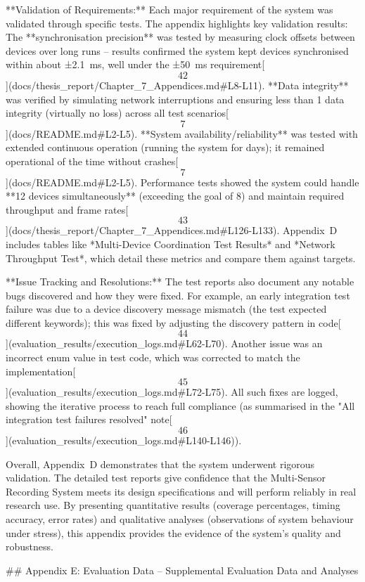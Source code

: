 \documentclass[12pt,a4paper]{article}
\begin{document}
{**Validation of Requirements:** Each major requirement of the system was
validated through specific tests. The appendix highlights key validation
results: The **synchronisation precision** was tested by measuring clock
offsets between devices over long runs -- results confirmed the system
kept devices synchronised within about ±2.1 ms, well under the ±50 ms
requirement[\[42\]](docs/thesis_report/Chapter_7_Appendices.md#L8-L11).
**Data integrity** was verified by simulating network interruptions and
ensuring less than 1%
data integrity (virtually no loss) across all test
scenarios[\[7\]](docs/README.md#L2-L5).
**System availability/reliability** was tested with extended continuous
operation (running the system for days); it remained operational %
of the time without
crashes[\[7\]](docs/README.md#L2-L5).
Performance tests showed the system could handle **12 devices
simultaneously** (exceeding the goal of 8) and maintain required
throughput and frame
rates[\[43\]](docs/thesis_report/Chapter_7_Appendices.md#L126-L133).
Appendix D includes tables like *Multi-Device Coordination Test Results*
and *Network Throughput Test*, which detail these metrics and compare
them against targets.

**Issue Tracking and Resolutions:** The test reports also document any
notable bugs discovered and how they were fixed. For example, an early
integration test failure was due to a device discovery message mismatch
(the test expected different keywords); this was fixed by adjusting the
discovery pattern in
code[\[44\]](evaluation_results/execution_logs.md#L62-L70).
Another issue was an incorrect enum value in test code, which was
corrected to match the
implementation[\[45\]](evaluation_results/execution_logs.md#L72-L75).
All such fixes are logged, showing the iterative process to reach full
compliance (as summarised in the "All integration test failures
resolved"
note[\[46\]](evaluation_results/execution_logs.md#L140-L146)).

Overall, Appendix D demonstrates that the system underwent rigorous
validation. The detailed test reports give confidence that the
Multi-Sensor Recording System meets its design specifications and will
perform reliably in real research use. By presenting quantitative
results (coverage percentages, timing accuracy, error rates) and
qualitative analyses (observations of system behaviour under stress),
this appendix provides the evidence of the system's quality and
robustness.

## Appendix E: Evaluation Data -- Supplemental Evaluation Data and Analyses

}
\end{document}
